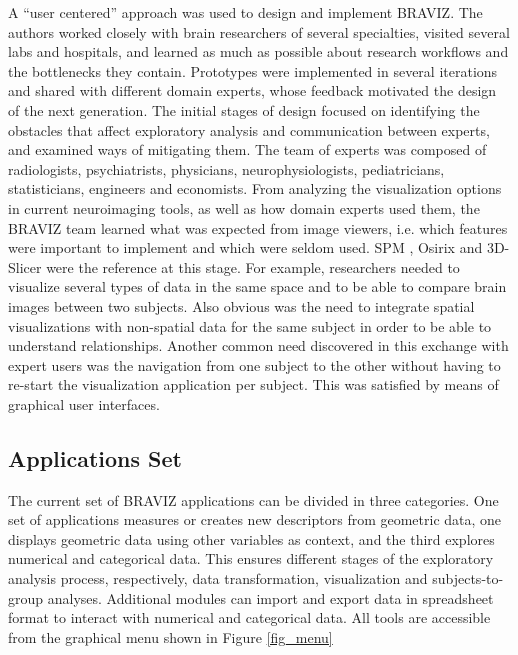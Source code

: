 \documentclass[twocolumn]{svjour3}
\begin{document}
A ``user centered'' approach \cite{wassink_applying_2009} was used to design and implement BRAVIZ. The authors worked closely with brain researchers of several specialties, visited several labs and hospitals, and learned as much as possible about research workflows and the bottlenecks they contain. Prototypes were implemented in several iterations and shared with different domain experts, whose feedback motivated the design of the next generation.
The initial stages of design focused on identifying the obstacles that affect exploratory analysis and communication between experts, and examined ways of mitigating them. The team of experts was composed of radiologists, psychiatrists, physicians, neurophysiologists, pediatricians, statisticians, engineers and economists.
From analyzing the visualization options in current neuroimaging tools, as well as how domain experts used them, the BRAVIZ team learned what was expected from image viewers, i.e. which features were important to implement and which were seldom used. SPM \cite{friston_statistical_2007}, Osirix \cite{rosset_osirix:_2004} and 3D-Slicer \cite{fedorov_3d_2012} were the reference at this stage. For example, researchers needed to visualize several types of data in the same space and to be able to compare brain images between two subjects. Also obvious was the need to integrate spatial visualizations with non-spatial data for the same subject in order to be able to understand relationships. Another common need discovered in this exchange with expert users was the navigation from one subject to the other without having to re-start the visualization application per subject. This was satisfied by means of graphical user interfaces.


\subsection{Applications Set}


The current set of BRAVIZ applications can be divided in three categories. One set of applications measures or creates new descriptors from geometric data, one displays geometric data using other variables as context, and the third explores numerical and categorical data. This ensures different stages of the exploratory analysis process, respectively, data transformation, visualization and subjects-to-group analyses. Additional modules can import and export data in spreadsheet format to interact with numerical and categorical data. All tools  are accessible from the graphical menu shown in Figure \ref{fig_menu}
\end{document}
